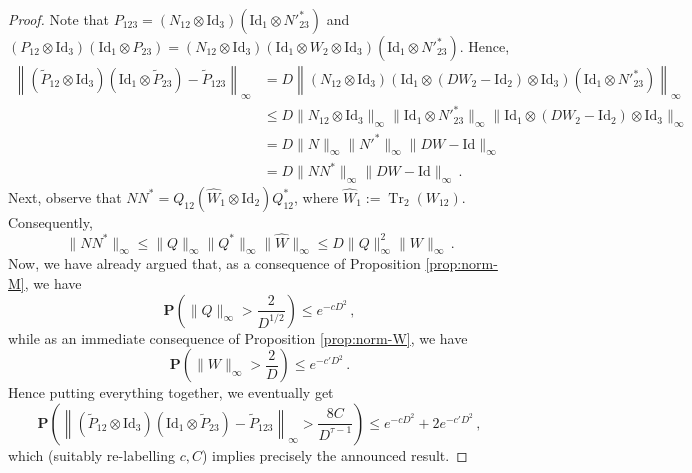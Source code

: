 \documentclass{amsart}
\renewcommand{\P}{\mathbf{P}}
\renewcommand{\leq}{\leqslant}
\newcommand{\Id}{\mathrm{Id}}
\DeclareMathOperator{\Tr}{Tr}
\begin{document}
\begin{proof}
    Note that $P_{123}=(N_{12}\otimes\Id_3)(\Id_1\otimes N'^*_{23})$ and $(P_{12}\otimes\Id_3)(\Id_1\otimes P_{23})= (N_{12}\otimes\Id_3)(\Id_1\otimes W_2\otimes\Id_3)(\Id_1\otimes N'^*_{23})$. Hence,
    \begin{align*}
        \left\| \left(\widetilde{P}_{12}\otimes\Id_3\right)\left(\Id_1\otimes \widetilde{P}_{23}\right) - \widetilde{P}_{123} \right\|_{\infty} & = D\left\| (N_{12}\otimes\Id_3)(\Id_1\otimes (DW_2-\Id_2)\otimes\Id_3)(\Id_1\otimes N'^*_{23}) \right\|_{\infty}              \\
                                                                                                                                                & \leq D \|N_{12}\otimes\Id_3\|_{\infty} \|\Id_1\otimes N'^*_{23}\|_{\infty} \|\Id_1\otimes (DW_2-\Id_2)\otimes\Id_3\|_{\infty} \\
                                                                                                                                                & = D \|N\|_{\infty} \|N'^*\|_{\infty} \|DW-\Id\|_{\infty}                                                                      \\
                                                                                                                                                & = D \|NN^*\|_{\infty} \|DW-\Id\|_{\infty} \, .
    \end{align*}
    Next, observe that $NN^*=Q_{12}(\hat{W}_1\otimes\Id_2)Q^*_{12}$, where $\hat{W}_1:=\Tr_2(W_{12})$. Consequently,
    \[ \|NN^*\|_{\infty} \leq \|Q\|_{\infty} \|Q^*\|_{\infty} \|\hat{W}\|_{\infty} \leq D \|Q\|_{\infty}^2 \|W\|_{\infty} \, . \]
    Now, we have already argued that, as a consequence of Proposition \ref{prop:norm-M}, we have
    \[ \P\left( \|Q\|_{\infty} > \frac{2}{D^{1/2}} \right) \leq e^{-cD^2} \, , \]
    while as an immediate consequence of Proposition \ref{prop:norm-W}, we have
    \[ \P\left( \|W\|_{\infty} > \frac{2}{D} \right) \leq e^{-c'D^2} \, . \]
    Hence putting everything together, we eventually get
    \[ \P\left( \left\| \left(\widetilde{P}_{12}\otimes\Id_3\right)\left(\Id_1\otimes \widetilde{P}_{23}\right) - \widetilde{P}_{123} \right\|_{\infty} > \frac{8C}{D^{\tau-1}} \right) \leq e^{-cD^2} + 2e^{-c'D^2} \, , \]
    which (suitably re-labelling $c,C$) implies precisely the announced result.
\end{proof}
\end{document}

